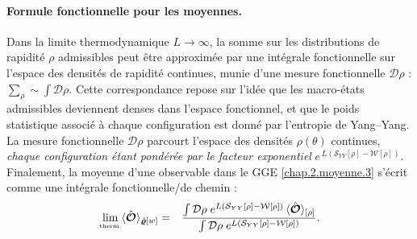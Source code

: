\paragraph{Formule fonctionnelle pour les moyennes.}

Dans la limite thermodynamique $L \to \infty$, la somme sur les distributions de rapidité $\rho$ admissibles peut être approximée par une intégrale fonctionnelle sur l’espace des densités de rapidité continues, munie d’une mesure fonctionnelle $\mathcal{D}\rho$ : 
\(
\sum_{\rho } \sim \int \mathcal{D} \rho .
\)
Cette correspondance repose sur l’idée que les macro-états admissibles deviennent denses dans l’espace fonctionnel, et que le poids statistique associé à chaque configuration est donné par l’entropie de Yang–Yang.
La mesure fonctionnelle $\mathcal{D}\rho$ parcourt l’espace des densités
$\rho(\theta)$ continues, \emph{chaque configuration étant pondérée par le
facteur exponentiel}
\(
e^{\,L(\mathcal{S}_{YY}[\rho]-\mathcal{W}[\rho])}.
\)
Finalement, la moyenne d'une observable dans le GGE \eqref{chap.2.moyenne.3} s’écrit comme une intégrale fonctionnelle/de chemin :
\begin{eqnarray}
	\underset{\mbox{\tiny therm.}}{\lim} \langle \hat{\bm{\mathcal{O}}} \rangle_{\hat{\bm{\varrho}}[w]} & = & \frac{\int \mathcal{D} \rho \; e^{L (\mathcal{S}_{YY}[\rho] - \mathcal{W}[\rho])} \, \langle\hat{\bm{\mathcal{O}}}\rangle_{[\rho]}}{\int \mathcal{D} \rho \; e^{L (\mathcal{S}_{YY}[\rho] - \mathcal{W}[\rho])}}. \label{chap:TBA:eq:ensemble_average}
\end{eqnarray}



